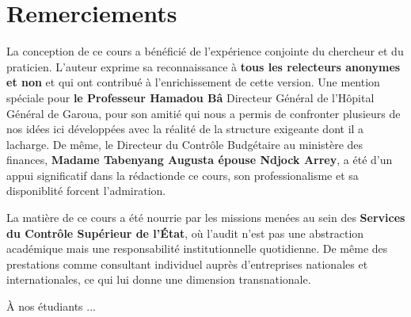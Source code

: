 \documentclass[12pt, a4paper, twoside, openright]{book}
\begin{document}
\clearpage
\thispagestyle{empty}
\chapter*{Remerciements}

La conception de ce cours a bénéficié de l'expérience conjointe du chercheur et du praticien. L'auteur exprime sa reconnaissance à \textbf{tous les relecteurs anonymes et non} et qui ont contribué à l'enrichissement de cette version. 
Une mention spéciale pour \textbf{le Professeur Hamadou Bâ} Directeur Général de l'Hôpital Général de Garoua, pour son amitié qui nous a permis de confronter  plusieurs de nos idées ici développées avec la réalité de la structure exigeante dont il a lacharge. De même, le Directeur du Contrôle Budgétaire au ministère des finances, \textbf{Madame Tabenyang Augusta épouse Ndjock Arrey}, a été d'un appui significatif dans la rédactionde ce cours, son professionalisme et sa disponiblité forcent l'admiration.

La matière de ce cours a été nourrie par les missions menées au sein des \textbf{Services du Contrôle Supérieur de l'État}, où l'audit n'est pas une abstraction académique mais une responsabilité institutionnelle quotidienne. De même des prestations comme consultant individuel auprès d'entreprises nationales et internationales, ce qui lui donne une dimension transnationale.

À nos étudiants ...

\clearpage
\tableofcontents

\clearpage
\listoffigures
{}

\listoftables
{}
\end{document}
